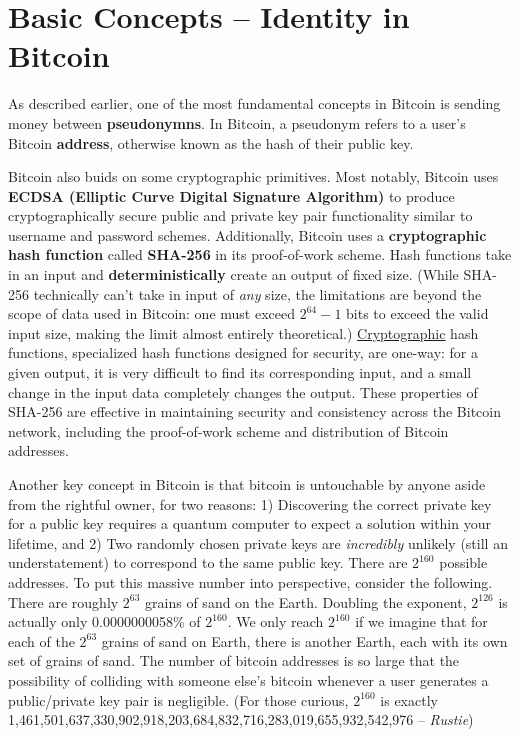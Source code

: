 \documentclass[11pt]{article}
\begin{document}
    \section*{Basic Concepts -- Identity in Bitcoin}
    
    As described earlier, one of the most fundamental concepts in Bitcoin is sending money between \textbf{pseudonymns}. In Bitcoin, a pseudonym refers to a user's Bitcoin \textbf{address}, otherwise known as the hash of their public key.
    
    Bitcoin also buids on some cryptographic primitives. Most notably, Bitcoin uses \textbf{ECDSA (Elliptic Curve Digital Signature Algorithm)} to produce cryptographically secure public and private key pair functionality similar to username and password schemes. Additionally, Bitcoin uses a \textbf{cryptographic hash function} called \textbf{SHA-256} in its proof-of-work scheme. Hash functions take in an input and \textbf{deterministically} create an output of fixed size. (While SHA-256 technically can't take in input of \textit{any} size, the limitations are beyond the scope of data used in Bitcoin: one must exceed $2^{64} - 1$ bits to exceed the valid input size, making the limit almost entirely theoretical.) \underline{Cryptographic} hash functions, specialized hash functions designed for security, are one-way: for a given output, it is very difficult to find its corresponding input, and a small change in the input data completely changes the output. These properties of SHA-256 are effective in maintaining security and consistency across the Bitcoin network, including the proof-of-work scheme and distribution of Bitcoin addresses.
    
    Another key concept in Bitcoin is that bitcoin is untouchable by anyone aside from the rightful owner, for two reasons: 1) Discovering the correct private key for a public key requires a quantum computer to expect a solution within your lifetime, and 2) Two randomly chosen private keys are \textit{incredibly} unlikely (still an understatement) to correspond to the same public key. There are $2^{160}$ possible addresses. To put this massive number into perspective, consider the following. There are roughly $2^{63}$ grains of sand on the Earth. Doubling the exponent, $2^{126}$ is actually only 0.0000000058\% of $2^{160}$. We only reach $2^{160}$ if we imagine that for each of the $2^{63}$ grains of sand on Earth, there is another Earth, each with its own set of grains of sand. The number of bitcoin addresses is so large that the possibility of colliding with someone else's bitcoin whenever a user generates a public/private key pair is negligible. (For those curious, $2^{160}$ is exactly 1,461,501,637,330,902,918,203,684,832,716,283,019,655,932,542,976 -- \textit{Rustie}) 
    
\end{document}
